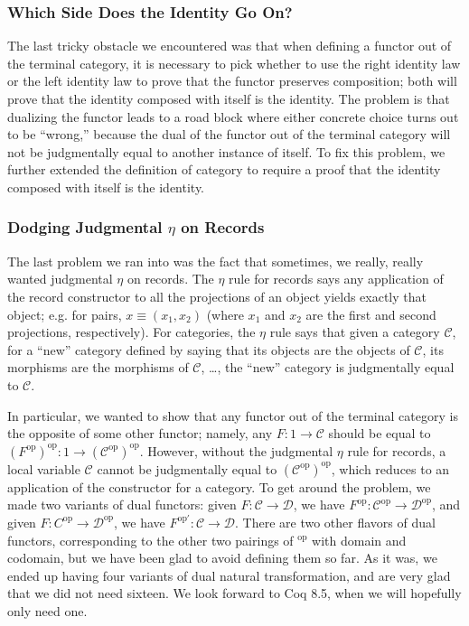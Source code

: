 \documentclass[runningheads]{llncs}
\newcommand{\cat}[1]{\ensuremath{\mathcal{#1}}}
\begin{document}
    \subsubsection{Which Side Does the Identity Go On?}
      The last tricky obstacle we encountered was that when defining a functor out of the terminal category, it is necessary to pick whether to use the right identity law or the left identity law to prove that the functor preserves composition; both will prove that the identity composed with itself is the identity.  The problem is that dualizing the functor leads to a road block where either concrete choice turns out to be ``wrong,'' because the dual of the functor out of the terminal category will not be judgmentally equal to another instance of itself.  To fix this problem, we further extended the definition of category to require a proof that the identity composed with itself is the identity.

    \subsubsection{Dodging Judgmental \texorpdfstring{$\eta$}{η} on Records}  \label{sec:no-judgmental-eta}
      The last problem we ran into was the fact that sometimes, we really, really wanted judgmental $\eta$ on records.  The $\eta$ rule for records says any application of the record constructor to all the projections of an object yields exactly that object; e.g. for pairs, $x \equiv (x_1, x_2)$ (where $x_1$ and $x_2$ are the first and second projections, respectively).  For categories, the $\eta$ rule says that given a category \cat C, for a ``new'' category defined by saying that its objects are the objects of \cat C, its morphisms are the morphisms of \cat C, \ldots, the ``new'' category is judgmentally equal to \cat C.

      In particular, we wanted to show that any functor out of the terminal category is the opposite of some other functor; namely, any $F : 1 \to \cat C$ should be equal to $(F^{\text{op}})^{\text{op}} : 1 \to (\cat C^{\text{op}})^{\text{op}}$.  However, without the judgmental $\eta$ rule for records, a local variable $\cat C$ cannot be judgmentally equal to $(\cat C^{\text{op}})^{\text{op}}$, which reduces to an application of the constructor for a category.  To get around the problem, we made two variants of dual functors: given $F : \cat C \to \cat D$, we have $F^{\text{op}} : \cat C^{\text{op}} \to \cat D^{\text{op}}$, and given $F : C^{\text{op}} \to \cat D^{\text{op}}$, we have $F^{\text{op}'} : \cat C \to \cat D$.  There are two other flavors of dual functors, corresponding to the other two pairings of ${}^{\text{op}}$ with domain and codomain, but we have been glad to avoid defining them so far.  As it was, we ended up having four variants of dual natural transformation, and are very glad that we did not need sixteen.  We look forward to Coq 8.5, when we will hopefully only need one.
\end{document}
